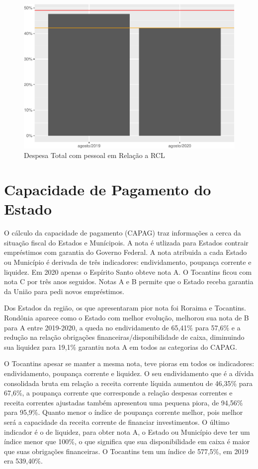 \begin{figure}[h]
\caption{Despesa Total com pessoal em Relação a RCL}
\includegraphics[width=\linewidth]{fig/unnamed-chunk-8-1.pdf}
\end{figure}

\section{Capacidade de Pagamento do
Estado}
O cálculo da capacidade de pagamento (CAPAG) traz informações a cerca da
situação fiscal do Estados e Munícipois. A nota é utlizada para Estados
contrair empréstimos com garantia do Governo Federal. A nota atribuida a
cada Estado ou Município é derivada de três indicadores: endividamento,
poupança corrente e liquidez. Em 2020 apenas o Espírito Santo obteve
nota A. O Tocantins ficou com nota C por três anos seguidos. Notas A e B
permite que o Estado receba garantia da União para pedi novos
empréstimos.

Dos Estados da região, os que apresentaram pior nota foi Roraima e
Tocantins. Rondônia aparece como o Estado com melhor evolução, melhorou
sua nota de B para A entre 2019-2020, a queda no endividamento de
65,41\% para 57,6\% e a redução na relação obrigações
financeiras/disponibilidade de caixa, diminuindo sua liquidez para
19,1\% garantiu nota A em todos as categorias do CAPAG.

O Tocantins apesar se manter a mesma nota, teve pioras em todos os
indicadores: endividamento, poupança corrente e liquidez. O seu
endividamento que é a dívida consolidada bruta em relação a receita
corrente líquida aumentou de 46,35\% para 67,6\%, a poupança corrente
que corresponde a relação despesas correntes e receita correntes
ajustadas também apresentou uma pequena piora, de 94,56\% para 95,9\%.
Quanto menor o índice de poupança corrente melhor, pois melhor será a
capacidade da receita corrente de financiar investimentos. O último
indicador é o de liquidez, para obter nota A, o Estado ou Município deve
ter um índice menor que 100\%, o que significa que sua disponibilidade
em caixa é maior que suas obrigações financeiras. O Tocantins tem um
índice de 577,5\%, em 2019 era 539,40\%.

